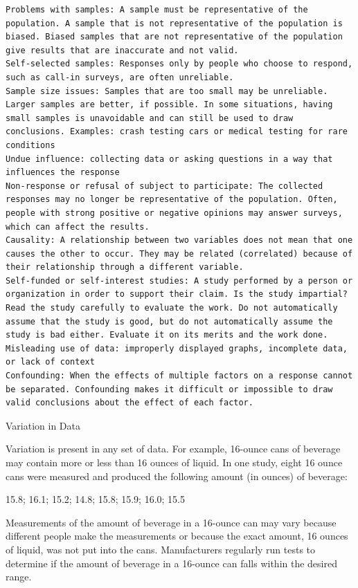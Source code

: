 \documentclass[
  letterpaper,
  DIV=11,
  numbers=noendperiod]{scrreprt}
\begin{document}
\begin{verbatim}
Problems with samples: A sample must be representative of the population. A sample that is not representative of the population is biased. Biased samples that are not representative of the population give results that are inaccurate and not valid.
Self-selected samples: Responses only by people who choose to respond, such as call-in surveys, are often unreliable.
Sample size issues: Samples that are too small may be unreliable. Larger samples are better, if possible. In some situations, having small samples is unavoidable and can still be used to draw conclusions. Examples: crash testing cars or medical testing for rare conditions
Undue influence: collecting data or asking questions in a way that influences the response
Non-response or refusal of subject to participate: The collected responses may no longer be representative of the population. Often, people with strong positive or negative opinions may answer surveys, which can affect the results.
Causality: A relationship between two variables does not mean that one causes the other to occur. They may be related (correlated) because of their relationship through a different variable.
Self-funded or self-interest studies: A study performed by a person or organization in order to support their claim. Is the study impartial? Read the study carefully to evaluate the work. Do not automatically assume that the study is good, but do not automatically assume the study is bad either. Evaluate it on its merits and the work done.
Misleading use of data: improperly displayed graphs, incomplete data, or lack of context
Confounding: When the effects of multiple factors on a response cannot be separated. Confounding makes it difficult or impossible to draw valid conclusions about the effect of each factor.
\end{verbatim}

Variation in Data

Variation is present in any set of data. For example, 16-ounce cans of
beverage may contain more or less than 16 ounces of liquid. In one
study, eight 16 ounce cans were measured and produced the following
amount (in ounces) of beverage:

15.8; 16.1; 15.2; 14.8; 15.8; 15.9; 16.0; 15.5

Measurements of the amount of beverage in a 16-ounce can may vary
because different people make the measurements or because the exact
amount, 16 ounces of liquid, was not put into the cans. Manufacturers
regularly run tests to determine if the amount of beverage in a 16-ounce
can falls within the desired range.
\end{document}

